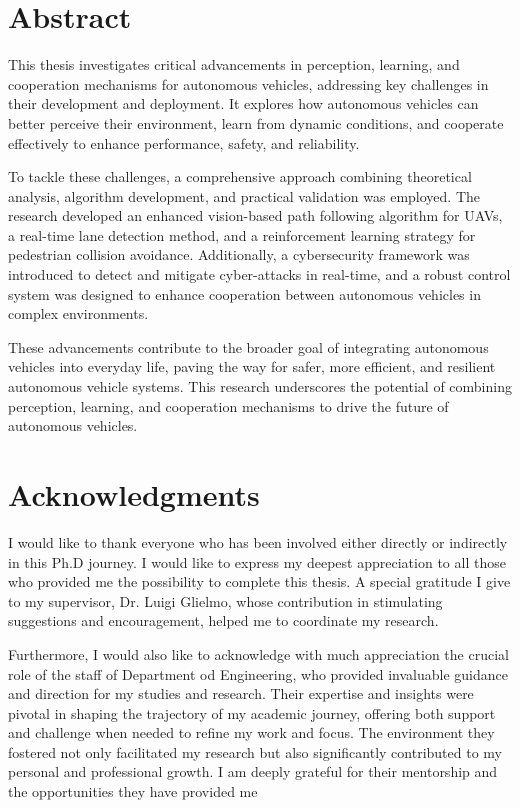 \chapter*{Abstract}

This thesis investigates critical advancements in perception, learning, and cooperation mechanisms for autonomous vehicles, addressing key challenges in their development and deployment. It explores how autonomous vehicles can better perceive their environment, learn from dynamic conditions, and cooperate effectively to enhance performance, safety, and reliability.

To tackle these challenges, a comprehensive approach combining theoretical analysis, algorithm development, and practical validation was employed. The research developed an enhanced vision-based path following algorithm for UAVs, a real-time lane detection method, and a reinforcement learning strategy for pedestrian collision avoidance. Additionally, a cybersecurity framework was introduced to detect and mitigate cyber-attacks in real-time, and a robust control system was designed to enhance cooperation between autonomous vehicles in complex environments.

These advancements contribute to the broader goal of integrating autonomous vehicles into everyday life, paving the way for safer, more efficient, and resilient autonomous vehicle systems. This research underscores the potential of combining perception, learning, and cooperation mechanisms to drive the future of autonomous vehicles.
\chapter*{Acknowledgments}




I would like to thank everyone who has been involved either directly or indirectly in
this Ph.D journey. I would like to express my deepest appreciation to all those who provided me the possibility to complete this thesis. A special gratitude I give to my supervisor, Dr. Luigi Glielmo, whose contribution in stimulating suggestions and encouragement, helped me to coordinate my research. 

Furthermore, I would also like to acknowledge with much appreciation the crucial role of the staff of Department od Engineering, who provided invaluable guidance and direction for my studies and research. Their expertise and insights were pivotal in shaping the trajectory of my academic journey, offering both support and challenge when needed to refine my work and focus. The environment they fostered not only facilitated my research but also significantly contributed to my personal and professional growth. I am deeply grateful for their mentorship and the opportunities they have provided me

